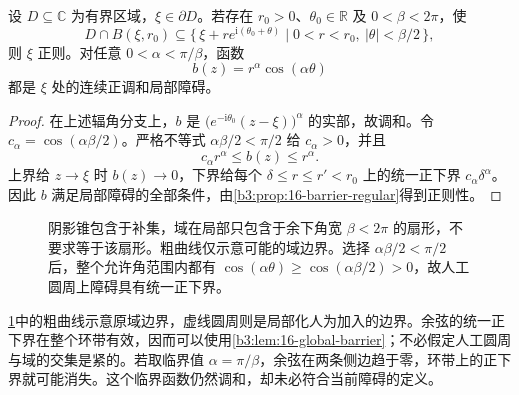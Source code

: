 \begin{proposition}[外锥条件与正则性]\label{b3:prop:16-exterior-cone-regular}
设 \(D\subseteq\mathbb C\) 为有界区域，\(\xi\in\partial D\)。若存在 \(r_0>0\)、\(\theta_0\in\mathbb R\) 及 \(0<\beta<2\pi\)，使
\[
 D\cap B(\xi,r_0)
 \subseteq\{\,\xi+r e^{\mathrm{i}(\theta_0+\theta)}
       \mid 0<r<r_0,\ |\theta|<\beta/2\,\},
\]
则 \(\xi\) 正则。对任意 \(0<\alpha<\pi/\beta\)，函数
\[
 b(z)=r^\alpha\cos(\alpha\theta)
\]
都是 \(\xi\) 处的连续正调和局部障碍。
\end{proposition}
\begin{proof}
在上述辐角分支上，\(b\) 是 \(\bigl(e^{-\mathrm{i}\theta_0}(z-\xi)\bigr)^\alpha\) 的实部，故调和。令 \(c_\alpha=\cos(\alpha\beta/2)\)。严格不等式 \(\alpha\beta/2<\pi/2\) 给 \(c_\alpha>0\)，并且
\[
 c_\alpha r^\alpha\le b(z)\le r^\alpha.
\]
上界给 \(z\to\xi\) 时 \(b(z)\to0\)，下界给每个 \(\delta\le r\le r'<r_0\) 上的统一正下界 \(c_\alpha\delta^\alpha\)。因此 \(b\) 满足局部障碍的全部条件，由\cref{b3:prop:16-barrier-regular}得到正则性。
\end{proof}
\begin{figure}[htbp]
\centering
{}
\caption[外锥与正障碍的扇形]{阴影锥包含于补集，域在局部只包含于余下角宽 \(\beta<2\pi\) 的扇形，不要求等于该扇形。粗曲线仅示意可能的域边界。选择 \(\alpha\beta/2<\pi/2\) 后，整个允许角范围内都有 \(\cos(\alpha\theta)\ge\cos(\alpha\beta/2)>0\)，故人工圆周上障碍具有统一正下界。}
\label{b3:fig:16-exterior-cone-barrier}
\end{figure}

\cref{b3:fig:16-exterior-cone-barrier}中的粗曲线示意原域边界，虚线圆周则是局部化人为加入的边界。余弦的统一正下界在整个环带有效，因而可以使用\cref{b3:lem:16-global-barrier}；不必假定人工圆周与域的交集是紧的。若取临界值 \(\alpha=\pi/\beta\)，余弦在两条侧边趋于零，环带上的正下界就可能消失。这个临界函数仍然调和，却未必符合当前障碍的定义。


